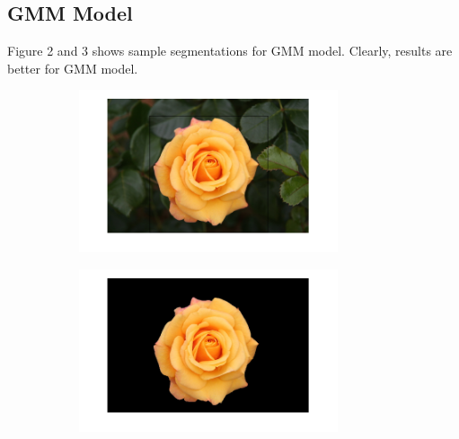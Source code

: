 \documentclass[a4paper]{article}
\begin{document}
\subsection{GMM Model}
Figure 2 and 3 shows sample segmentations for GMM model. Clearly, results are better for GMM model.
\begin{figure}[h]
\begin{subfigure}{.5\textwidth}
  \centering
  \includegraphics[width = 3in]{rose_input_g.png}
  \label{fig:sfig1}
\end{subfigure}%
\begin{subfigure}{.5\textwidth}
  \centering
  \includegraphics[width = 3in]{rose_output_g.png}
  \label{fig:sfig2}
\end{subfigure}



\end{figure}
\end{document}
